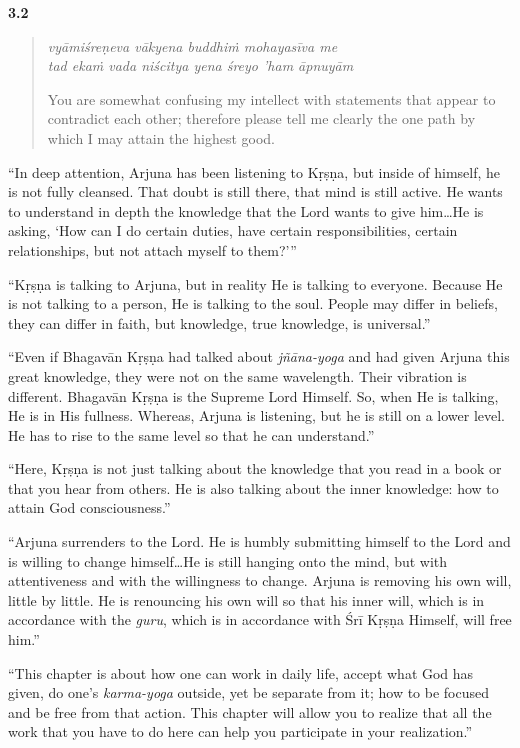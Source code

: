 \par\noindent\textbf{3.2}\par
\begin{verse}
\textit{vyāmiśreṇeva vākyena buddhiṁ mohayasīva me} \\
\textit{tad ekaṁ vada niścitya yena śreyo ’ham āpnuyām}

\noindent You are somewhat confusing my intellect with statements that appear to contradict each other; therefore please tell me clearly the one path by which I may attain the highest good.
\end{verse}
\par



\enquote{In deep attention, Arjuna has been listening to Kṛṣṇa, but inside of himself, he is not fully cleansed. That doubt is still there, that mind is still active. He wants to understand in depth the knowledge that the Lord wants to give him\ldots He is asking, \enquote{How can I do certain duties, have certain responsibilities, certain relationships, but not attach myself to them?}}

\enquote{Kṛṣṇa is talking to Arjuna, but in reality He is talking to everyone. Because He is not talking to a person, He is talking to the soul. People may differ in beliefs, they can differ in faith, but knowledge, true knowledge, is universal.}

\enquote{Even if Bhagavān Kṛṣṇa had talked about \textit{jñāna-yoga} and had given Arjuna this great knowledge, they were not on the same wavelength. Their vibration is different. Bhagavān Kṛṣṇa is the Supreme Lord Himself. So, when He is talking, He is in His fullness. Whereas, Arjuna is listening, but he is still on a lower level. He has to rise to the same level so that he can understand.}

\enquote{Here, Kṛṣṇa is not just talking about the knowledge that you read in a book or that you hear from others. He is also talking about the inner knowledge: how to attain God consciousness.}

\enquote{Arjuna surrenders to the Lord. He is humbly submitting himself to the Lord and is willing to change himself\ldots He is still hanging onto the mind, but with attentiveness and with the willingness to change. Arjuna is removing his own will, little by little. He is renouncing his own will so that his inner will, which is in accordance with the \textit{guru}, which is in accordance with Śrī Kṛṣṇa Himself, will free him.}

\enquote{This chapter is about how one can work in daily life, accept what God has given, do one’s \textit{karma-yoga} outside, yet be separate from it; how to be focused and be free from that action. This chapter will allow you to realize that all the work that you have to do here can help you participate in your realization.}



